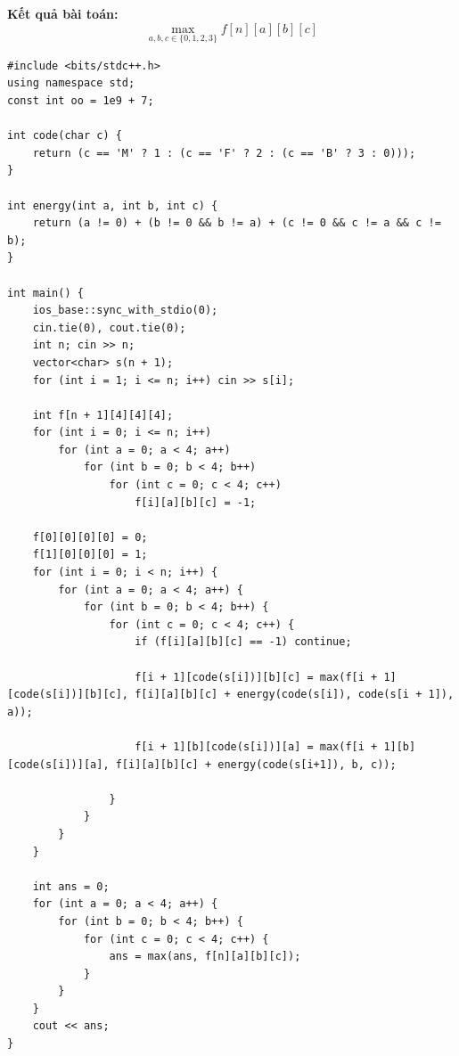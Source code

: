 \textbf{Kết quả bài toán:} 
\[
\max_{a,b,c \in \{0,1,2,3\}} f[n][a][b][c]
\]



\begin{lstlisting}[title=\centering\textbf{Cài đặt}]
#include <bits/stdc++.h>
using namespace std;
const int oo = 1e9 + 7;

int code(char c) {
    return (c == 'M' ? 1 : (c == 'F' ? 2 : (c == 'B' ? 3 : 0)));
}

int energy(int a, int b, int c) {
    return (a != 0) + (b != 0 && b != a) + (c != 0 && c != a && c != b);
}

int main() {
    ios_base::sync_with_stdio(0); 
    cin.tie(0), cout.tie(0);
    int n; cin >> n;
    vector<char> s(n + 1);
    for (int i = 1; i <= n; i++) cin >> s[i];

    int f[n + 1][4][4][4];
    for (int i = 0; i <= n; i++) 
        for (int a = 0; a < 4; a++)
            for (int b = 0; b < 4; b++) 
                for (int c = 0; c < 4; c++)
                    f[i][a][b][c] = -1;
                    
    f[0][0][0][0] = 0;
    f[1][0][0][0] = 1;  
    for (int i = 0; i < n; i++) {
        for (int a = 0; a < 4; a++) {
            for (int b = 0; b < 4; b++) {
                for (int c = 0; c < 4; c++) {
                    if (f[i][a][b][c] == -1) continue;

                    f[i + 1][code(s[i])][b][c] = max(f[i + 1][code(s[i])][b][c], f[i][a][b][c] + energy(code(s[i]), code(s[i + 1]), a));

                    f[i + 1][b][code(s[i])][a] = max(f[i + 1][b][code(s[i])][a], f[i][a][b][c] + energy(code(s[i+1]), b, c));

                }
            }
        }
    }

    int ans = 0;
    for (int a = 0; a < 4; a++) {
        for (int b = 0; b < 4; b++) {
            for (int c = 0; c < 4; c++) {
                ans = max(ans, f[n][a][b][c]);
            }
        }
    }
    cout << ans;
}
\end{lstlisting}


